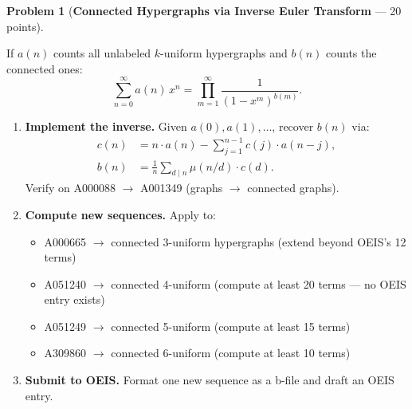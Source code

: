 \documentclass[11pt,letterpaper]{article}
\theoremstyle{definition}
\newtheorem{problem}{Problem}
\theoremstyle{remark}
\begin{document}
\bigskip


\begin{problem}[\textbf{Connected Hypergraphs via Inverse Euler Transform} --- 20 points]\label{prob:euler}

If $a(n)$ counts all unlabeled $k$-uniform hypergraphs and $b(n)$ counts the connected ones:
\[
\sum_{n=0}^{\infty} a(n)\, x^n = \prod_{m=1}^{\infty} \frac{1}{(1 - x^m)^{b(m)}}.
\]

\begin{enumerate}[label=(\alph*)]
  \item \textbf{Implement the inverse.} Given $a(0), a(1), \ldots$, recover $b(n)$ via:
  \begin{align*}
    c(n) &= n \cdot a(n) - \textstyle\sum_{j=1}^{n-1} c(j) \cdot a(n - j), \\
    b(n) &= \frac{1}{n} \textstyle\sum_{d \mid n} \mu(n/d) \cdot c(d).
  \end{align*}
  Verify on A000088 $\to$ A001349 (graphs $\to$ connected graphs).

  \item \textbf{Compute new sequences.} Apply to:
  \begin{itemize}
    \item A000665 $\to$ connected 3-uniform hypergraphs (extend beyond OEIS's 12 terms)
    \item A051240 $\to$ connected 4-uniform (compute at least 20 terms --- no OEIS entry exists)
    \item A051249 $\to$ connected 5-uniform (compute at least 15 terms)
    \item A309860 $\to$ connected 6-uniform (compute at least 10 terms)
  \end{itemize}

  \item \textbf{Submit to OEIS.} Format one new sequence as a b-file and draft an OEIS entry.
\end{enumerate}
\end{problem}

\bigskip

\end{document}
